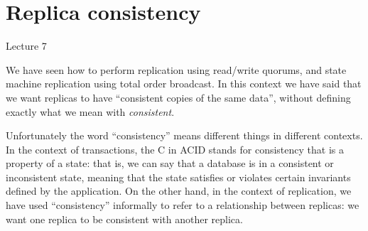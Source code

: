 
\section{Replica consistency}\label{sec:consistency}

\begin{frame}
    \begin{center}
        Lecture 7\\[2em]
        \Large{\color{darkblue}{Replica consistency}}
    \end{center}
\end{frame}

We have seen how to perform replication using read/write quorums, and state machine replication using total order broadcast.
In this context we have said that we want replicas to have ``consistent copies of the same data'', without defining exactly what we mean with \emph{consistent}.

Unfortunately the word ``consistency'' means different things in different contexts.
In the context of transactions, the C in ACID stands for consistency that is a property of a state: that is, we can say that a database is in a consistent or inconsistent state, meaning that the state satisfies or violates certain invariants defined by the application.
On the other hand, in the context of replication, we have used ``consistency'' informally to refer to a relationship between replicas: we want one replica to be consistent with another replica.

